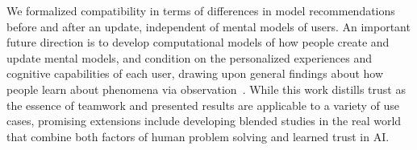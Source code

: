 \documentclass[letterpaper]{article} %
\newcommand{\bug}
    {\mbox{\rule{2mm}{2mm}}}
\newcommand{\Bug}[1]
    {\bug \footnote{BUG: {#1}}}
\newcommand{\?}{\mbox{?}}
\begin{document}
We formalized compatibility in terms of differences in model recommendations before and after an update, independent of mental models of users. An important future direction is to develop computational models of how people create and update mental models, and condition on the personalized experiences and cognitive capabilities of each user, drawing upon general findings about how people learn about phenomena via observation~\cite{reber1989implicit}. While this work distills trust as the essence of teamwork and presented results are applicable to a variety of use cases, promising extensions include developing blended studies in the real world that combine both factors of human problem solving and learned trust in AI. 




\end{document}
